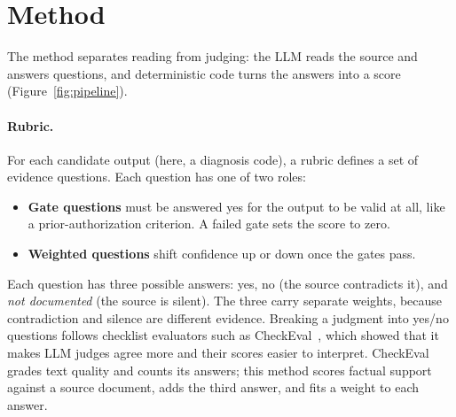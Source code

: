 \documentclass[10pt,letterpaper]{article}
\newcommand{\nd}{\textit{not documented}}
\begin{document}
\section{Method}\label{sec:method}

The method separates reading from judging: the LLM reads the source and answers questions, and deterministic code turns the answers into a score (Figure~\ref{fig:pipeline}).

\paragraph{Rubric.} For each candidate output (here, a diagnosis code), a rubric defines a set of evidence questions. Each question has one of two roles:
\begin{itemize}
  \item \textbf{Gate questions} must be answered yes for the output to be valid at all, like a prior-authorization criterion. A failed gate sets the score to zero.
  \item \textbf{Weighted questions} shift confidence up or down once the gates pass.
\end{itemize}
Each question has three possible answers: yes, no (the source contradicts it), and \nd{} (the source is silent). The three carry separate weights, because contradiction and silence are different evidence. Breaking a judgment into yes/no questions follows checklist evaluators such as CheckEval~\cite{checkeval}, which showed that it makes LLM judges agree more and their scores easier to interpret. CheckEval grades text quality and counts its answers; this method scores factual support against a source document, adds the third answer, and fits a weight to each answer.
\end{document}

